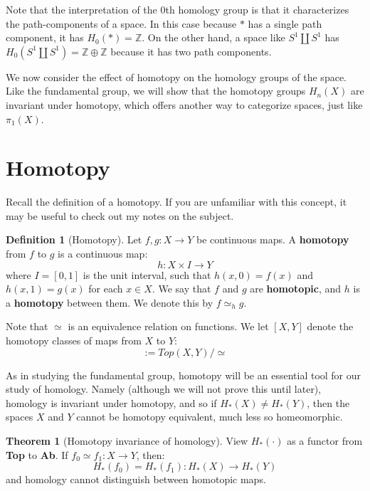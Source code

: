 \documentclass[11pt, oneside]{amsart}   	%
\theoremstyle{definition}
\newtheorem{definition}{Definition}[section]
\newtheorem{theorem}{Theorem}[section]
\begin{document}
Note that the interpretation of the $0$th homology group is that it characterizes the path-components of a space. In this 
case because $*$ has a single path component, it has $H_0(*) = \mathbb Z$. On the other hand, a space like $S^1\coprod 
S^1$ has $H_0(S^1\coprod S^1) = \mathbb Z\oplus\mathbb Z$ because it has two path components. 

We now consider the effect of homotopy on the homology groups of the space. Like the fundamental group, we will show 
that the homotopy groups $H_n(X)$ are invariant under homotopy, which offers another way to categorize spaces, just like 
$\pi_1(X)$. 

\newpage
\section{Homotopy}

Recall the definition of a homotopy. If you are unfamiliar with this concept, it may be useful to check out my notes on 
the subject.

\begin{definition}[Homotopy]
	Let $f, g : X\rightarrow Y$ be continuous maps. A \textbf{homotopy} from $f$ to $g$ is a continuous map:
	\begin{equation}
		h : X\times I\rightarrow Y
	\end{equation}
	where $I = [0, 1]$ is the unit interval, such that $h(x, 0) = f(x)$ and $h(x, 1) = g(x)$ for each $x\in X$. We say that 
	$f$ and $g$ are \textbf{homotopic}, and $h$ is a \textbf{homotopy} between them. We denote this by $f\simeq_h g$. 
\end{definition}

Note that $\simeq$ is an equivalence relation on functions. We let $[X, Y]$ denote the homotopy classes of maps 
from $X$ to $Y$:
\begin{equation}
	[X, Y] := Top(X, Y) / \simeq
\end{equation}

As in studying the fundamental group, homotopy will be an essential tool for our study of homology. Namely (although 
we will not prove this until later), homology is invariant under homotopy, and so if $H_*(X)\neq H_*(Y)$, then the spaces 
$X$ and $Y$ cannot be homotopy equivalent, much less so homeomorphic.
\begin{theorem}[Homotopy invariance of homology]
	View $H_*(\cdot)$ as a functor from \textbf{Top} to \textbf{Ab}. If $f_0\simeq f_1 : X\rightarrow Y$, then:
	\begin{equation}
		H_*(f_0) = H_*(f_1) : H_*(X)\rightarrow H_*(Y)
	\end{equation}
	and homology cannot distinguish between homotopic maps. 
\end{theorem}
\end{document}
